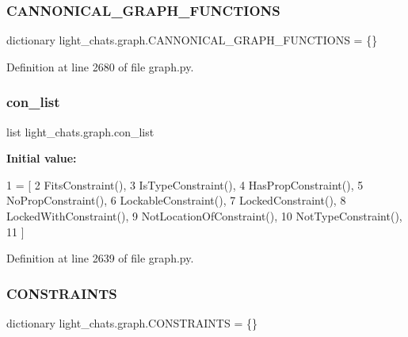 \subsubsection{\texorpdfstring{C\+A\+N\+N\+O\+N\+I\+C\+A\+L\+\_\+\+G\+R\+A\+P\+H\+\_\+\+F\+U\+N\+C\+T\+I\+O\+NS}{CANNONICAL\_GRAPH\_FUNCTIONS}}
{\footnotesize\ttfamily dictionary light\+\_\+chats.\+graph.\+C\+A\+N\+N\+O\+N\+I\+C\+A\+L\+\_\+\+G\+R\+A\+P\+H\+\_\+\+F\+U\+N\+C\+T\+I\+O\+NS = \{\}}



Definition at line 2680 of file graph.\+py.

\mbox{\label{namespacelight__chats_1_1graph_ace36e19843bd13fa12f329197aa50184}} 
\subsubsection{\texorpdfstring{con\+\_\+list}{con\_list}}
{\footnotesize\ttfamily list light\+\_\+chats.\+graph.\+con\+\_\+list}

{\bfseries Initial value\+:}
\begin{DoxyCode}
1 =  [
2     FitsConstraint(),
3     IsTypeConstraint(),
4     HasPropConstraint(),
5     NoPropConstraint(),
6     LockableConstraint(),
7     LockedConstraint(),
8     LockedWithConstraint(),
9     NotLocationOfConstraint(),
10     NotTypeConstraint(),
11 ]
\end{DoxyCode}


Definition at line 2639 of file graph.\+py.

\mbox{\label{namespacelight__chats_1_1graph_a97d73c4d58258f6b8616fb163da4f039}} 
\subsubsection{\texorpdfstring{C\+O\+N\+S\+T\+R\+A\+I\+N\+TS}{CONSTRAINTS}}
{\footnotesize\ttfamily dictionary light\+\_\+chats.\+graph.\+C\+O\+N\+S\+T\+R\+A\+I\+N\+TS = \{\}}



